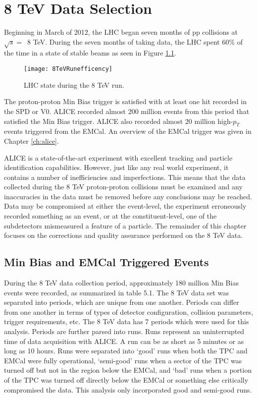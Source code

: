 \chapter{8 TeV Data Selection} \label{ch:data}

Beginning in March of 2012, the LHC began seven months of pp collisions at $\sqrt{s} = \,$ 8 TeV. During the seven months of taking data, the LHC spent 60\% of the time in a state of stable beams as seen in Figure \ref{fig:RunEffer}.

\begin{figure}[h]
\texttt{[image: 8TeVRunefficency]}
\centering
\caption{LHC state during the 8 TeV run. }
\label{fig:RunEffer}
\end{figure}


The proton-proton Min Bias trigger is satisfied with at least one hit recorded in the SPD or V0.  ALICE recorded almost 200 million events from this period that satisfied the Min Bias trigger.  ALICE also recorded almost 20 million high-$p_{T}$ events triggered from the EMCal.  An overview of the EMCal trigger was given in Chapter \ref{ch:alice}.

ALICE is a state-of-the-art experiment with excellent tracking and particle identification capabilities.  However, just like any real world experiment, it contains a number of inefficiencies and imperfections.  This means that the data collected during the 8 TeV proton-proton collisions must be examined and any inaccuracies in the data must be removed before any conclusions may be reached.  Data may be compromised at either the event-level, the experiment erroneously recorded something as an event, or at the constituent-level, one of the subdetectors mismeasured a feature of a particle.  The remainder of this chapter focuses on the corrections and quality assurance performed on the 8 TeV data.



\section{Min Bias and EMCal Triggered Events}

During the 8 TeV data collection period, approximately 180 million Min Bias events were recorded, as summarized in table 5.1.  The 8 TeV data set was separated into periods, which are unique from one another.  Periods can differ from one another in terms of types of detector configuration, collision parameters, trigger requirements, etc. The 8 TeV data has 7 periods which were used for this analysis.  Periods are further parsed into runs.  Runs represent an uninterrupted time of data acquisition with ALICE. A run can be as short as 5 minutes or as long as 10 hours.  Runs were separated into `good' runs when both the TPC and EMCal were fully operational, `semi-good' runs when a sector of the TPC was turned off but not in the region below the EMCal, and `bad' runs when a portion of the TPC was turned off directly below the EMCal or something else critically compromised the data.  This analysis only incorporated good and semi-good runs.

